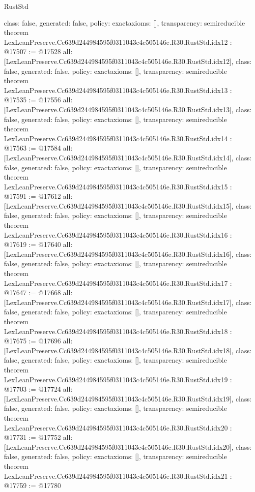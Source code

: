 \begin{lexlean}{RustStd}
\begin{coremodule}
{  class: false,
  generated: false,
  policy: exact{axioms: []},
  transparency: semireducible
}
theorem LexLeanPreserve.Cc639d244984595f0311043c4c505146e.R30.RustStd.idx12 : @17507 := @17528 {
  all: [LexLeanPreserve.Cc639d244984595f0311043c4c505146e.R30.RustStd.idx12],
  class: false,
  generated: false,
  policy: exact{axioms: []},
  transparency: semireducible
}
theorem LexLeanPreserve.Cc639d244984595f0311043c4c505146e.R30.RustStd.idx13 : @17535 := @17556 {
  all: [LexLeanPreserve.Cc639d244984595f0311043c4c505146e.R30.RustStd.idx13],
  class: false,
  generated: false,
  policy: exact{axioms: []},
  transparency: semireducible
}
theorem LexLeanPreserve.Cc639d244984595f0311043c4c505146e.R30.RustStd.idx14 : @17563 := @17584 {
  all: [LexLeanPreserve.Cc639d244984595f0311043c4c505146e.R30.RustStd.idx14],
  class: false,
  generated: false,
  policy: exact{axioms: []},
  transparency: semireducible
}
theorem LexLeanPreserve.Cc639d244984595f0311043c4c505146e.R30.RustStd.idx15 : @17591 := @17612 {
  all: [LexLeanPreserve.Cc639d244984595f0311043c4c505146e.R30.RustStd.idx15],
  class: false,
  generated: false,
  policy: exact{axioms: []},
  transparency: semireducible
}
theorem LexLeanPreserve.Cc639d244984595f0311043c4c505146e.R30.RustStd.idx16 : @17619 := @17640 {
  all: [LexLeanPreserve.Cc639d244984595f0311043c4c505146e.R30.RustStd.idx16],
  class: false,
  generated: false,
  policy: exact{axioms: []},
  transparency: semireducible
}
theorem LexLeanPreserve.Cc639d244984595f0311043c4c505146e.R30.RustStd.idx17 : @17647 := @17668 {
  all: [LexLeanPreserve.Cc639d244984595f0311043c4c505146e.R30.RustStd.idx17],
  class: false,
  generated: false,
  policy: exact{axioms: []},
  transparency: semireducible
}
theorem LexLeanPreserve.Cc639d244984595f0311043c4c505146e.R30.RustStd.idx18 : @17675 := @17696 {
  all: [LexLeanPreserve.Cc639d244984595f0311043c4c505146e.R30.RustStd.idx18],
  class: false,
  generated: false,
  policy: exact{axioms: []},
  transparency: semireducible
}
theorem LexLeanPreserve.Cc639d244984595f0311043c4c505146e.R30.RustStd.idx19 : @17703 := @17724 {
  all: [LexLeanPreserve.Cc639d244984595f0311043c4c505146e.R30.RustStd.idx19],
  class: false,
  generated: false,
  policy: exact{axioms: []},
  transparency: semireducible
}
theorem LexLeanPreserve.Cc639d244984595f0311043c4c505146e.R30.RustStd.idx20 : @17731 := @17752 {
  all: [LexLeanPreserve.Cc639d244984595f0311043c4c505146e.R30.RustStd.idx20],
  class: false,
  generated: false,
  policy: exact{axioms: []},
  transparency: semireducible
}
theorem LexLeanPreserve.Cc639d244984595f0311043c4c505146e.R30.RustStd.idx21 : @17759 := @17780 {
}
\end{coremodule}
\end{lexlean}
